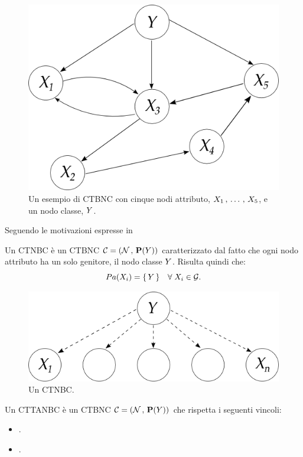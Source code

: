 \begin{figure}
\centering
\includegraphics[width=0.9\columnwidth]{immagini/ctbnc}
\caption[Un esempio di \acs{CTBNC}]{Un esempio di \acl{CTBNC} con cinque nodi attributo, $\mathnormal{X}_1\,,\,\dotsc\,,\,\mathnormal{X}_5$, e un nodo classe, $\mathnormal{Y}$.}
\label{fig:ctbnc-example}
\end{figure}

Seguendo le motivazioni espresse in~\citet{Friedman1997}

\begin{definizione}\label{defn:ctnbc}
Un \acf{CTNBC} è un \acl{CTBNC} $\mathcal{C}=(\mathcal{N}\,,\,\mathbf{P}(\mathnormal{Y}))$ caratterizzato dal fatto che ogni nodo attributo ha un solo genitore, il nodo classe $\mathnormal{Y}$. Risulta quindi che:
\[
Pa(\mathnormal{X}_i)=\{\,\mathnormal{Y}\,\} \quad \forall \; \mathnormal{X}_i \in \mathcal{G}\text{.}
\]
\end{definizione}

\begin{figure}
\centering
\includegraphics[width=0.9\columnwidth]{immagini/ctnb}
\caption[Un \acs{CTNBC}]{Un \acl{CTNBC}.}
\label{fig:ctnb}
\end{figure}

\begin{definizione}\label{defn:cttanbc}
Un \acf{CTTANBC} è un \acl{CTBNC} $\mathcal{C}=(\mathcal{N}\,,\,\mathbf{P}(\mathnormal{Y}))$ che rispetta i seguenti vincoli:
\begin{itemize}
    \item .
    \item .
\end{itemize}
\end{definizione}

